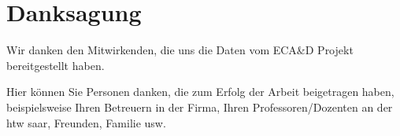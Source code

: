 
\begingroup
	\let\clearpage\relax
	\let\cleardoublepage\relax
	\let\cleardoublepage\relax
	\chapter*{Danksagung}
    
    Wir danken den Mitwirkenden, die uns die Daten vom ECA\&D Projekt bereitgestellt haben. \cite{ecadWetterdaten}
    
	Hier können Sie Personen danken, die zum Erfolg der Arbeit beigetragen haben, beispielsweise Ihren Betreuern in der Firma, Ihren Professoren/Dozenten an der htw saar, Freunden, Familie usw.

\endgroup

